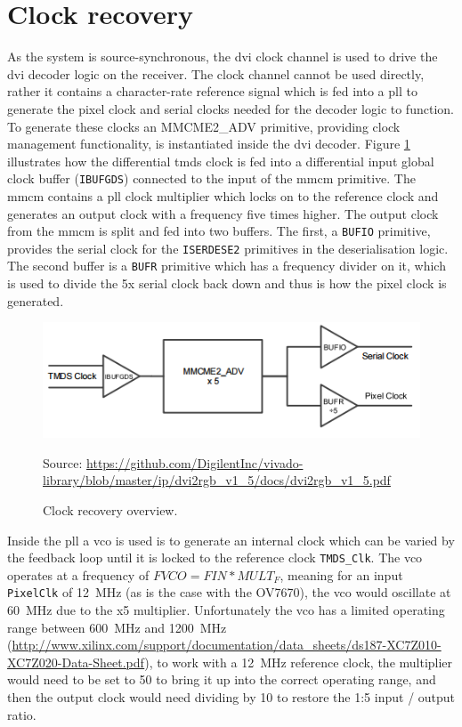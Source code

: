 \section{Clock recovery}
As the system is source-synchronous, the \gls{dvi} clock channel is used to drive the \gls{dvi} decoder logic on the receiver. The clock channel cannot be used directly, rather it contains a character-rate reference signal which is fed into a \gls{pll} to generate the pixel clock and serial clocks needed for the decoder logic to function. To generate these clocks an MMCME2\_ADV primitive, providing clock management functionality, is instantiated inside the \gls{dvi} decoder. Figure \ref{fig:clock_recovery} illustrates how the differential \gls{tmds} clock is fed into a differential input global clock buffer (\texttt{IBUFGDS}) connected to the input of the \gls{mmcm} primitive. The \gls{mmcm} contains a \gls{pll} clock multiplier which locks on to the reference clock and generates an output clock with a frequency five times higher. The output clock from the \gls{mmcm} is split and fed into two buffers. The first, a \texttt{BUFIO} primitive, provides the serial clock for the \texttt{ISERDESE2} primitives in the deserialisation logic. The second buffer is a \texttt{BUFR} primitive which has a frequency divider on it, which is used to divide the 5x serial clock back down and thus is how the pixel clock is generated. 

\begin{figure}
  \centering
  \includegraphics[width=1\textwidth]{./img/clock_recovery.png}\par
  Source: \url{https://github.com/DigilentInc/vivado-library/blob/master/ip/dvi2rgb_v1_5/docs/dvi2rgb_v1_5.pdf}
  \caption{Clock recovery overview.}
  \label{fig:clock_recovery}
\end{figure}

Inside the \gls{pll} a \gls{vco} is used is to generate an internal clock which can be varied by the feedback loop until it is locked to the reference clock \texttt{TMDS\_Clk}. The \gls{vco} operates at a frequency of \(FVCO = FIN * MULT_F\), meaning for an input \texttt{PixelClk} of \SI{12}{\mega\hertz} (as is the case with the OV7670), the \gls{vco} would oscillate at \SI{60}{\mega\hertz} due to the x5 multiplier. Unfortunately the \gls{vco} has a limited operating range between \SI{600}{\mega\hertz} and \SI{1200}{\mega\hertz} (\url{http://www.xilinx.com/support/documentation/data_sheets/ds187-XC7Z010-XC7Z020-Data-Sheet.pdf}), to work with a \SI{12}{\mega\hertz} reference clock, the multiplier would need to be set to 50 to bring it up into the correct operating range, and then the output clock would need dividing by 10 to restore the 1:5 input / output ratio.

